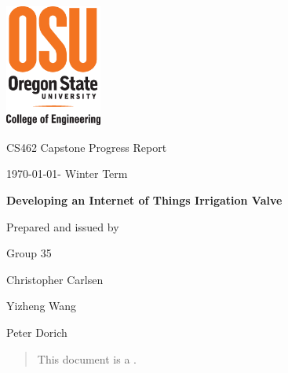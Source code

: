 \documentclass[onecolumn, draftclsnofoot,10pt, compsoc]{IEEEtran}
\def \CapstoneTeamName{     Group}
\def \CapstoneTeamNumber{       35}
\def \GroupMemberOne{           Christopher Carlsen}
\def \GroupMemberTwo{           Yizheng Wang}
\def \GroupMemberThree{         Peter Dorich}
\def \CapstoneProjectName{      Developing an Internet of Things Irrigation Valve}
\def \CapstoneSponsorCompany{       OSU \textbar\hspace{.05in} Openly Published Environmental Sensing (OPEnS) Lab}
\def \CapstoneSponsorPerson{        Chet Udell}
\def \DocType{      %
    Progress Report
}
\newcommand{\NameSigPair}[1]{\par
    \makebox[2.75in][r]{#1} \hfil   \makebox[3.25in]{\makebox[2.25in]{\hrulefill} \hfill        \makebox[.75in]{\hrulefill}}
    \par\vspace{-12pt} \textit{\tiny\noindent
        \makebox[2.75in]{} \hfil        \makebox[3.25in]{\makebox[2.25in][r]{Signature} \hfill  \makebox[.75in][r]{Date}}}}
\renewcommand{\NameSigPair}[1]{#1}
\begin{document}
    \begin{titlepage}
        \begin{singlespace}
            \includegraphics[height=4cm]{coe_v_spot1}
            \hfill 
            \par\vspace{.2in}
            \centering
            \scshape{
                \huge CS462 Capstone \DocType \par
                {\large\today - Winter Term}\par
                \vspace{.5in}
                \textbf{\Huge\CapstoneProjectName}\par
                \vfill
                {\large Prepared and issued by }\par
                Group\CapstoneTeamNumber\par
                \vspace{5pt}
                {\Large
                    \NameSigPair{\GroupMemberOne}\par
                    \NameSigPair{\GroupMemberTwo}\par
                    \NameSigPair{\GroupMemberThree}\par
                }
                \vspace{20pt}
            }
            \begin{abstract}
                This document is a .
            \end{abstract}     
        \end{singlespace}
    \end{titlepage}
    \newpage
    \tableofcontents
    \clearpage
\end{document}
